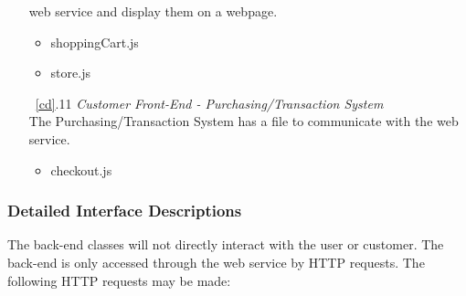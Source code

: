 \documentclass{article}
\newcommand{\br}{\vspace{2mm}}
\begin{document}
\begin{enumerate}
        web service and display them on a webpage.
        \begin{itemize}
            \item shoppingCart.js
            \item store.js
        \end{itemize}
    \item[~\ref{cd}.11 ] \emph{Customer Front-End - Purchasing/Transaction System}\br\\
        The Purchasing/Transaction System has a file to communicate with the
        web service.
        \begin{itemize}
            \item checkout.js
        \end{itemize}
\end{enumerate}


\subsubsection{Detailed Interface Descriptions}
\label{did}

The back-end classes will not directly interact with the user or customer.  The
back-end is only accessed through the web service by HTTP requests.  The following
HTTP requests may be made:
\end{document}
